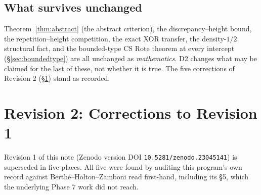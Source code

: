 \documentclass[11pt]{article}
\begin{document}
\subsection*{What survives unchanged}

Theorem~\ref{thm:abstract} (the abstract criterion), the discrepancy--height bound, the
repetition--height competition, the exact XOR transfer, the density-$1/2$ structural fact, and the
bounded-type CS Rote theorem at every intercept (\S\ref{sec:boundedtype}) are all unchanged as
\emph{mathematics}. D2 changes what may be claimed for the last of these, not whether it is true.
The five corrections of Revision 2 (\S\ref{sec:rev2}) stand as recorded.

\section{Revision 2: Corrections to Revision 1}
\label{sec:rev2}

Revision 1 of this note (Zenodo version DOI \texttt{10.5281/zenodo.23045141}) is superseded in five
places. All five were found by auditing this program's own record against
Berth\'e--Holton--Zamboni \cite{BHZ2006} read first-hand, including its \S5, which the underlying
Phase 7 work did not reach.
\end{document}

